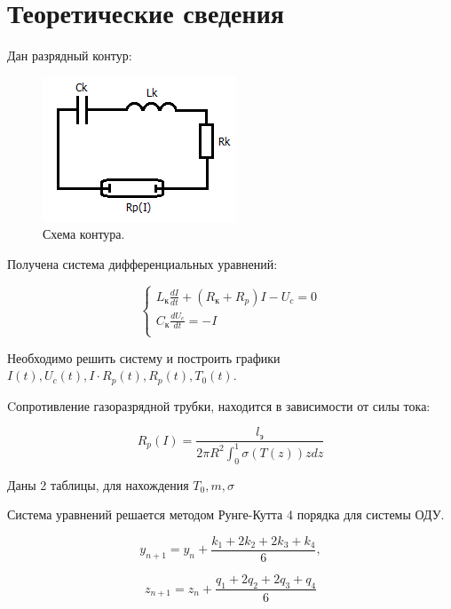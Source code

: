 \chapter{Теоретические сведения}


Дан разрядный контур:
\begin{figure}[H]
    \centering
    \includegraphics[scale=0.7]{data/image/scheme.png}
    \caption{Схема контура.}
\end{figure}

Получена система дифференциальных уравнений:

\begin{equation*}
    \begin{cases}
        L_\text{к}\frac{dI}{dt} + (R_\text{к} + R_p) I - U_c = 0 \\
        C_\text{к} \frac{dU_c}{dt} = -I \\
    \end{cases}
\end{equation*}

Необходимо решить систему и построить графики $I(t), U_c(t), I\cdot R_p(t), R_p(t), T_0(t)$.

Cопротивление газоразрядной трубки, находится в зависимости от силы тока:

\begin{equation*}
    R_p(I) = \frac{l_{\text{э}}}{2 \pi R^2 \int_0^1 \sigma(T(z))zdz}
\end{equation*}

Даны 2 таблицы, для нахождения $T_0, m, \sigma$

Система уравнений решается методом Рунге-Кутта 4 порядка для системы ОДУ.

\begin{equation*}
    y_{n+1} = y_n + \frac{k_1 + 2k_2 + 2k_3 + k_4}{6},
\end{equation*}

\begin{equation*}
    z_{n+1} = z_n + \frac{q_1 + 2q_2 + 2q_3 + q_4}{6}
\end{equation*}


